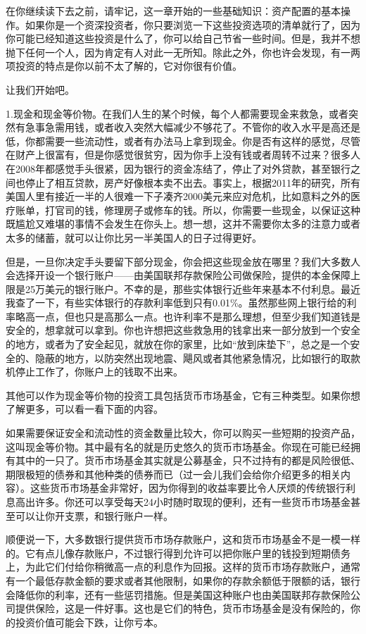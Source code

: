在你继续读下去之前，请牢记，这一章开始的一些基础知识：资产配置的基本操作。如果你是一个资深投资者，你只要浏览一下这些投资选项的清单就行了，因为你可能已经知道这些投资是什么了，你可以给自己节省一些时间。但是，我并不想抛下任何一个人，因为肯定有人对此一无所知。除此之外，你也许会发现，有一两项投资的特点是你以前不太了解的，它对你很有价值。

让我们开始吧。

1.现金和现金等价物。在我们人生的某个时候，每个人都需要现金来救急，或者突然有急事急需用钱，或者收入突然大幅减少不够花了。不管你的收入水平是高还是低，你都需要一些流动性，或者有办法马上拿到现金。你是否有这样的感觉，尽管在财产上很富有，但是你感觉很贫穷，因为你手上没有钱或者周转不过来？很多人在2008年都感觉手头很紧，因为银行的资金冻结了，停止了对外贷款，甚至银行之间也停止了相互贷款，房产好像根本卖不出去。事实上，根据2011年的研究，所有美国人里有接近一半的人很难一下子凑齐2000美元来应对危机，比如意料之外的医疗账单，打官司的钱，修理房子或修车的钱。所以，你需要一些现金，以保证这种既尴尬又难堪的事情不会发生在你头上。想一想，这并不需要你太多的注意力或者太多的储蓄，就可以让你比另一半美国人的日子过得更好。

但是，一旦你决定手头要留下部分现金，你会把这些现金放在哪里？我们大多数人会选择开设一个银行账户——由美国联邦存款保险公司做保险，提供的本金保障上限是25万美元的银行账户。不幸的是，那些实体银行近些年来基本不付利息。最近我查了一下，有些实体银行的存款利率低到只有0.01\%。虽然那些网上银行给的利率略高一点，但也只是高那么一点。也许利率不是那么理想，但至少我们知道钱是安全的，想拿就可以拿到。你也许想把这些救急用的钱拿出来一部分放到一个安全的地方，或者为了安全起见，就放在你的家里，比如“放到床垫下”，总之是一个安全的、隐蔽的地方，以防突然出现地震、飓风或者其他紧急情况，比如银行的取款机停止工作了，你账户上的钱取不出来。

其他可以作为现金等价物的投资工具包括货币市场基金，它有三种类型。如果你想了解更多，可以看一看下面的内容。

如果需要保证安全和流动性的资金数量比较大，你可以购买一些短期的投资产品，这叫现金等价物。其中最有名的就是历史悠久的货币市场基金。你现在可能已经拥有其中的一只了。货币市场基金其实就是公募基金，只不过持有的都是风险很低、期限极短的债券和其他种类的债券而已（过一会儿我们会给你介绍更多的相关内容）。这些货币市场基金非常好，因为你得到的收益率要比令人厌烦的传统银行利息高出许多。你还可以享受每天24小时随时取现的便利，还有一些货币市场基金甚至可以让你开支票，和银行账户一样。

顺便说一下，大多数银行提供货币市场存款账户，这和货币市场基金不是一模一样的。它有点儿像存款账户，不过银行得到允许可以把你账户里的钱投到短期债务上，为此它们付给你稍微高一点的利息作为回报。这样的货币市场存款账户，通常有一个最低存款金额的要求或者其他限制，如果你的存款余额低于限额的话，银行会降低你的利率，还有一些惩罚措施。但是美国这种账户也由美国联邦存款保险公司提供保险，这是一件好事。这也是它们的特色，货币市场基金是没有保险的，你的投资价值可能会下跌，让你亏本。

